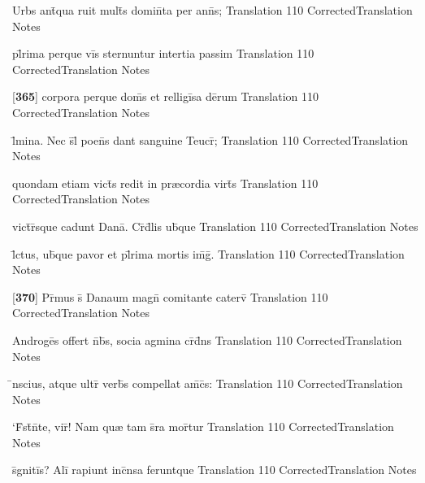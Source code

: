 \latline
  {Urbs ant\={\macron {\i}}qua ruit mult\={}s domin\={}ta per ann\={}s;}
  { Translation }
  {110}
  { CorrectedTranslation }
  { Notes }


\latline
  {pl\={}rima perque vi\={}s sternuntur intertia passim}
  { Translation }
  {110}
  { CorrectedTranslation }
  { Notes }


\latline
  {[\textbf{365}] corpora perque dom\={}s et relligi\={}sa de\={}rum}
  { Translation }
  {110}
  { CorrectedTranslation }
  { Notes }


\latline
  {l\={\macron {\i}}mina.  Nec s\={}l\={\macron {\i}} poen\={}s dant sanguine Teucr\={\macron {\i}};}
  { Translation }
  {110}
  { CorrectedTranslation }
  { Notes }


\latline
  {quondam etiam vict\={\macron {\i}}s redit in pr{\ae}cordia virt\={}s}
  { Translation }
  {110}
  { CorrectedTranslation }
  { Notes }


\latline
  {vict\={}r\={}sque cadunt Dana\={\macron {\i}}.  Cr\={}d\={}lis ub\={\macron {\i}}que}
  { Translation }
  {110}
  { CorrectedTranslation }
  { Notes }


\latline
  {l\={}ctus, ub\={\macron {\i}}que pavor et pl\={}rima mortis im\={}g\={}.}
  { Translation }
  {110}
  { CorrectedTranslation }
  { Notes }


\latline
  {[\textbf{370}] Pr\={\macron {\i}}mus s\={} Danaum magn\={} comitante caterv\={}}
  { Translation }
  {110}
  { CorrectedTranslation }
  { Notes }


\latline
  {Androge\={}s offert n\={}b\={\macron {\i}}s, socia agmina cr\={}d\={}ns}
  { Translation }
  {110}
  { CorrectedTranslation }
  { Notes }


\latline
  {\={\macron {\i}}nscius, atque ultr\={} verb\={\macron {\i}}s compellat am\={\macron {\i}}c\={\macron {\i}}s:}
  { Translation }
  {110}
  { CorrectedTranslation }
  { Notes }


\latline
  {`F\={}st\={\macron {\i}}n\={}te, vir\={\macron {\i}}!  Nam qu{\ae} tam s\={}ra mor\={}tur}
  { Translation }
  {110}
  { CorrectedTranslation }
  { Notes }


\latline
  {s\={}gniti\={}s?  Ali\={\macron {\i}} rapiunt inc\={}nsa feruntque}
  { Translation }
  {110}
  { CorrectedTranslation }
  { Notes }


